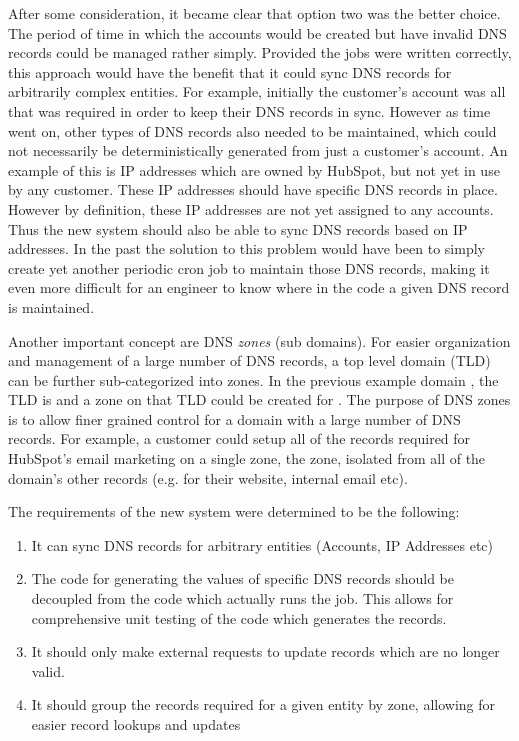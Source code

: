 After some consideration, it became clear that option two was the better choice. The period of time in which the accounts would be created but have invalid DNS records could be managed rather simply. Provided the jobs were written correctly, this approach would have the benefit that it could sync DNS records for arbitrarily complex entities. For example, initially the customer's account was all that was required in order to keep their DNS records in sync. However as time went on, other types of DNS records also needed to be maintained, which could not necessarily be deterministically generated from just a customer's account. An example of this is IP addresses which are owned by HubSpot, but not yet in use by any customer. These IP addresses should have specific DNS records in place. However by definition, these IP addresses are not yet assigned to any accounts. Thus the new system should also be able to sync DNS records based on IP addresses. In the past the solution to this problem would have been to simply create yet another periodic cron job to maintain those DNS records, making it even more difficult for an engineer to know where in the code a given DNS record is maintained.

Another important concept are DNS \textit{zones} (sub domains). For easier organization and management of a large number of DNS records, a top level domain (TLD) can be further sub-categorized into zones. In the previous example domain , the TLD is  and a zone on that TLD could be created for . The purpose of DNS zones is to allow finer grained control for a domain with a large number of DNS records. For example, a customer could setup all of the records required for HubSpot's email marketing on a single zone, the  zone, isolated from all of the domain's other records (e.g. for their website, internal email etc). 

The requirements of the new system were determined to be the following:
\begin{enumerate}
      \item{It can sync DNS records for arbitrary entities (Accounts, IP Addresses etc)}
      \item{The code for generating the values of specific DNS records should be decoupled from the code which actually runs the job. This allows for comprehensive unit testing of the code which generates the records.}
      \item{It should only make external requests to update records which are no longer valid.}
      \item{It should group the records required for a given entity by zone, allowing for easier record lookups and updates}
\end{enumerate}


